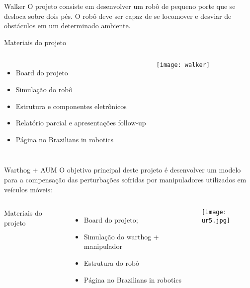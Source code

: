 %
\begin{frame}[t]{Walker} 
    O projeto consiste em desenvolver um robô de pequeno porte que se desloca sobre dois pés. O robô deve ser capaz de se locomover e desviar de obstáculos em um determinado ambiente.
    \vspace*{0.3cm}

    Materiais do projeto
   
        \begin{columns}[c]
                \begin{itemize}
                    \item Board do projeto
                    \item Simulação do robô
                    \item Estrutura e componentes eletrônicos
                    \item Relatório parcial e apresentações follow-up
                    \item Página no Brazilians in robotics
                \end{itemize}
                \texttt{[image: walker]}
        \end{columns}

\end{frame}
\begin{frame}[t]{Warthog + AUM} 
   O objetivo principal deste projeto é desenvolver um modelo para a compensação das perturbações sofridas por manipuladores utilizados em veículos móveis:
   \vspace*{0.3cm}
   
        \begin{columns}[c]
            Materiais do projeto
            \vspace*{0.3cm}
            \begin{itemize}
                \item Board do projeto;
                \item Simulação do warthog + manipulador
                \item Estrutura do robô
                \item Página no Brazilians in robotics
            \end{itemize}
                \texttt{[image: ur5.jpg]}
        \end{columns}

\end{frame}
